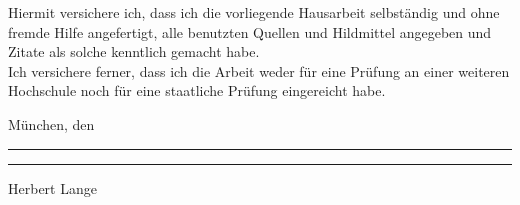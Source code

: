 Hiermit versichere ich, dass ich die vorliegende Hausarbeit selbständig und ohne fremde Hilfe angefertigt, alle benutzten Quellen und Hildmittel angegeben und Zitate als solche kenntlich gemacht habe. \\
Ich versichere ferner, dass ich die Arbeit weder für eine Prüfung an einer weiteren Hochschule noch für eine staatliche Prüfung eingereicht habe. \par
\vspace{3cm}
München, den \rule{7cm}{0.4pt} \par
\vspace{3cm}
\rule{10cm}{0.4pt} \par
Herbert Lange